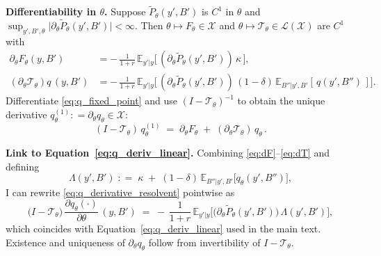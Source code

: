 \documentclass[12pt]{article}
\providecommand{\coloneqq}{\mathrel{\mathop:}=}
\theoremstyle{plain}
\newcommand{\E}{\mathbb{E}}
\begin{document}
\textbf{Differentiability in \(\theta\).} Suppose \(\tilde P_\theta(y',B')\) is \(C^1\) in \(\theta\) and \(\sup_{y',B',\theta}\big|\partial_\theta \tilde P_\theta(y',B')\big|<\infty\). Then \(\theta\mapsto F_\theta\in\mathcal X\) and \(\theta\mapsto \mathcal T_\theta\in\mathcal L(\mathcal X)\) are \(C^1\) with
\begin{align}
	\partial_\theta F_\theta(y,B')               & = -\,\frac{1}{1+r}\,\E_{y'|y}\big[\,(\partial_\theta \tilde P_\theta(y',B'))\,\kappa\,\big], \label{eq:dF}                                   \\
	(\partial_\theta \mathcal T_\theta)q\,(y,B') & = -\,\frac{1}{1+r}\,\E_{y'|y}\Big[\,(\partial_\theta \tilde P_\theta(y',B'))\,(1-\delta)\,\E_{B''|y',B'}[\,q(y',B'')\,] \Big]. \label{eq:dT}
\end{align}
Differentiate \eqref{eq:q_fixed_point} and use \((I-\mathcal T_\theta)^{-1}\) to obtain the unique derivative \(q_\theta^{(1)}\coloneqq\partial_\theta q_\theta\in\mathcal X\):
\begin{equation}\label{eq:q_derivative_resolvent}
	(I-\mathcal T_\theta)\,q_\theta^{(1)}\;=\;\partial_\theta F_\theta\;+\;(\partial_\theta \mathcal T_\theta)\,q_\theta\,.
\end{equation}

\textbf{Link to Equation~\eqref{eq:q_deriv_linear}.} Combining \eqref{eq:dF}–\eqref{eq:dT} and defining
\begin{equation}\label{eq:Lambda_def}
	\Lambda(y',B')\;\coloneqq\;\kappa\;+\;(1-\delta)\,\E_{B''|y',B'}\big[q_\theta(y',B'')\big],
\end{equation}
I can rewrite \eqref{eq:q_derivative_resolvent} pointwise as
\begin{equation}\label{eq:q_deriv_linear_appendix}
	\big(I-\mathcal T_\theta\big)\,\frac{\partial q_\theta(\cdot)}{\partial\theta}\,(y,B')\;=\;-\,\frac{1}{1+r}\,\E_{y'|y}\Big[\big(\partial_\theta \tilde P_\theta(y',B')\big)\,\Lambda(y',B')\Big],
\end{equation}
which coincides with Equation~\eqref{eq:q_deriv_linear} used in the main text. Existence and uniqueness of \(\partial_\theta q_\theta\) follow from invertibility of \(I-\mathcal T_\theta\).



\end{document}
